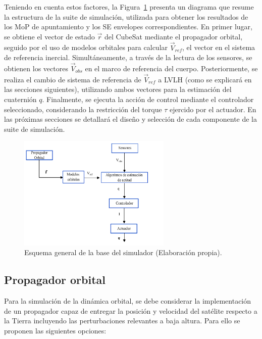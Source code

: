 Teniendo en cuenta estos factores, la Figura~\ref{fig:bloq_gen} presenta un diagrama que resume la estructura de la suite de simulación, utilizada para obtener los resultados de los  MoP de apuntamiento y los SE envelopes correspondientes. En primer lugar, se obtiene el vector de estado $\vec{r}$ del CubeSat mediante el propagador orbital, seguido por el uso de modelos orbitales para calcular $\vec{V}_{ref}$, el vector en el sistema de referencia inercial. Simultáneamente, a través de la lectura de los sensores, se obtienen los vectores $\vec{V}_{obs}$ en el marco de referencia del cuerpo. Posteriormente, se realiza el cambio de sistema de referencia de $\vec{V}_{ref}$ a LVLH (como se explicará en las secciones siguientes), utilizando ambos vectores para la estimación del cuaternión $q$. Finalmente, se ejecuta la acción de control mediante el controlador seleccionado, considerando la restricción del torque $\tau$ ejercido por el actuador. En las próximas secciones se detallará el diseño y selección de cada componente de la suite de simulación.

\begin{figure}[h]
	\centering    
	\includegraphics[width=0.65\textwidth]{bloques_generico.pdf}
	\caption{Esquema general de la base del simulador (Elaboración propia).}
	\label{fig:bloq_gen}
\end{figure}

\subsection{Propagador orbital}

Para la simulación de la dinámica orbital, se debe considerar la implementación de un propagador capaz de entregar la posición y velocidad del satélite respecto a la Tierra incluyendo las perturbaciones relevantes a baja altura. Para ello se proponen las siguientes opciones:

